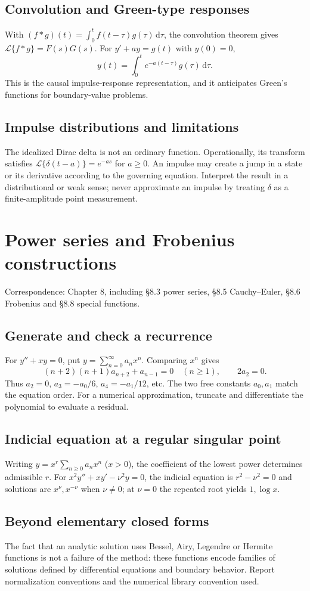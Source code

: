 \documentclass[11pt,letterpaper,oneside]{report}
\theoremstyle{definition}\newtheorem{definition}[theorem]{Definition}
\theoremstyle{remark}\newtheorem{remark}[theorem]{Remark}
\newcommand{\dd}{\,\mathrm{d}}
\newcommand{\lap}{\mathcal{L}}
\begin{document}
\section{Convolution and Green-type responses}
With $(f*g)(t)=\int_0^t f(t-\tau)g(\tau)\dd\tau$, the convolution theorem gives $\lap\{f*g\}=F(s)G(s)$. For $y'+ay=g(t)$ with $y(0)=0$,
\[y(t)=\int_0^t e^{-a(t-\tau)}g(\tau)\dd\tau.\]
This is the causal impulse-response representation, and it anticipates Green's functions for boundary-value problems.
\section{Impulse distributions and limitations}
The idealized Dirac delta is not an ordinary function. Operationally, its transform satisfies $\lap\{\delta(t-a)\}=e^{-as}$ for $a\ge0$. An impulse may create a jump in a state or its derivative according to the governing equation. Interpret the result in a distributional or weak sense; never approximate an impulse by treating $\delta$ as a finite-amplitude point measurement.
\chapter{Power series and Frobenius constructions}
\begin{bookground}Correspondence: Chapter 8, including \S8.3 power series, \S8.5 Cauchy--Euler, \S8.6 Frobenius and \S8.8 special functions.\end{bookground}
\section{Generate and check a recurrence}
For $y''+xy=0$, put $y=\sum_{n=0}^\infty a_n x^n$. Comparing $x^n$ gives
\[(n+2)(n+1)a_{n+2}+a_{n-1}=0\quad(n\ge1),\qquad2a_2=0.\]
Thus $a_2=0$, $a_3=-a_0/6$, $a_4=-a_1/12$, etc. The two free constants $a_0,a_1$ match the equation order. For a numerical approximation, truncate and differentiate the polynomial to evaluate a residual.
\section{Indicial equation at a regular singular point}
Writing $y=x^r\sum_{n\ge0}a_nx^n$ ($x>0$), the coefficient of the lowest power determines admissible $r$. For $x^2y''+xy'-\nu^2y=0$, the indicial equation is $r^2-\nu^2=0$ and solutions are $x^{\nu},x^{-\nu}$ when $\nu\ne0$; at $\nu=0$ the repeated root yields $1,\log x$.
\section{Beyond elementary closed forms}
The fact that an analytic solution uses Bessel, Airy, Legendre or Hermite functions is not a failure of the method: these functions encode families of solutions defined by differential equations and boundary behavior. Report normalization conventions and the numerical library convention used.
\end{document}
